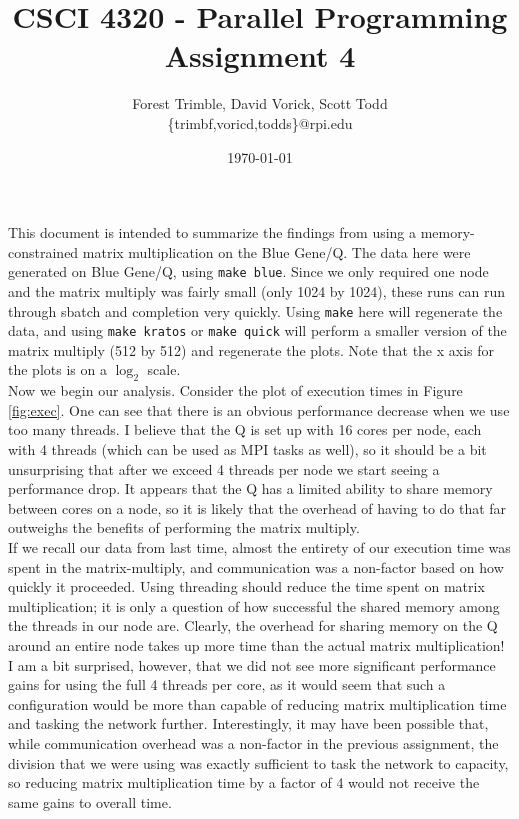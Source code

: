 \documentclass[twocolumn]{article}
\title{CSCI 4320 - Parallel Programming\\Assignment 4}
\author{Forest Trimble, David Vorick, Scott Todd\\\{trimbf,voricd,todds\}@rpi.edu}
\date{\today}
\begin{document}
\maketitle

\pagestyle{fancy}
\fancyhead{}
\fancyhead[R]{\today}

This document is intended to summarize the findings from using a 
memory-constrained matrix multiplication on the Blue Gene/Q. The data here were 
generated on Blue Gene/Q, using \texttt{make blue}. Since we only required one 
node and the matrix multiply was fairly small (only 1024 by 1024), these runs
can run through sbatch and completion very quickly. Using \texttt{make} here will
regenerate the data, and using \texttt{make kratos} or \texttt{make quick} 
will perform a smaller version of the matrix multiply (512 by 512) and regenerate
the plots. Note that the x axis for the plots is on a $\log_2$ scale.\\

Now we begin our analysis. Consider the plot of execution times in Figure 
\ref{fig:exec}. One can see that there is an obvious performance decrease when we
use too many threads. I believe that the Q is set up with 16 cores per node, each 
with 4 threads (which can be used as MPI tasks as well), so it should be a bit 
unsurprising that after we exceed 4 threads per node we start seeing a performance
drop. It appears that the Q has a limited ability to share memory between cores on 
a node, so it is likely that the overhead of having to do that far outweighs the
benefits of performing the matrix multiply. \\

If we recall our data from last time, almost the entirety of our 
execution time was spent in the matrix-multiply, and communication was a 
non-factor based on how quickly it proceeded. Using threading should reduce the 
time spent on matrix multiplication; it is only a question of how successful the
shared memory among the threads in our node are. Clearly, the overhead for sharing
memory on the Q around an entire node takes up more time than the actual matrix 
multiplication! I am a bit surprised, however, that we did not see more significant
performance gains for using the full 4 threads per core, as it would seem that such
a configuration would be more than capable of reducing matrix multiplication time
and tasking the network further. Interestingly, it may have been possible that, while
communication overhead was a non-factor in the previous assignment, the division that
we were using was exactly sufficient to task the network to capacity, so reducing
matrix multiplication time by a factor of 4 would not receive the same gains to 
overall time. \\
\end{document}
